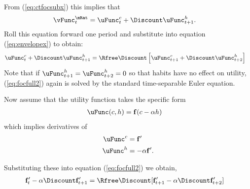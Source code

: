 From (\ref{eq:ctfocsubx}) this implies that
\begin{equation}\begin{gathered}\begin{aligned}
\vFunc_{t}^{\mRat} & =  \uFunc^{c}_{t}+\Discount \uFunc_{t+1}^{h}.
\end{aligned}\end{gathered}\end{equation}
Roll this equation forward one period and substitute into equation (\ref{eq:envelopex})
to obtain:
\begin{equation}\begin{gathered}\begin{aligned}
\uFunc^{c}_{t} + \Discount \uFunc_{t+1}^{h} & =
\Rfree \Discount \left[\uFunc^{c}_{t+1}+\Discount \uFunc^{h}_{t+2}\right] \label{eq:focfull2}
\end{aligned}\end{gathered}\end{equation}
Note that if
$\uFunc_{t+1}^{h}=\uFunc_{t+2}^{h}=0$ so that habits have no effect on
utility, (\ref{eq:focfull2}) again is solved by the standard
time-separable Euler equation.

Now assume that the utility function takes the specific form
\begin{equation}\begin{gathered}\begin{aligned}
        \uFunc(c,h) & =  \mathbf{f}(c-\alpha h)
\end{aligned}\end{gathered}\end{equation}
which implies derivatives of
\begin{equation}\begin{gathered}\begin{aligned}
        \uFunc^{c} & =  \mathbf{f}^{\prime}  \\
        \uFunc^{h} & =  -\alpha \mathbf{f}^{\prime}.
\end{aligned}\end{gathered}\end{equation}

Substituting these into equation (\ref{eq:focfull2}) we obtain,
\begin{equation}\begin{gathered}\begin{aligned}
        \mathbf{f}_{t}^{\prime}-\alpha \Discount \mathbf{f}_{t+1}^{\prime} & =  \Rfree\Discount[\mathbf{f}_{t+1}^{\prime} -\alpha \Discount \mathbf{f}_{t+2}^{\prime}] \label{eq:vpeq}
\end{aligned}\end{gathered}\end{equation}

